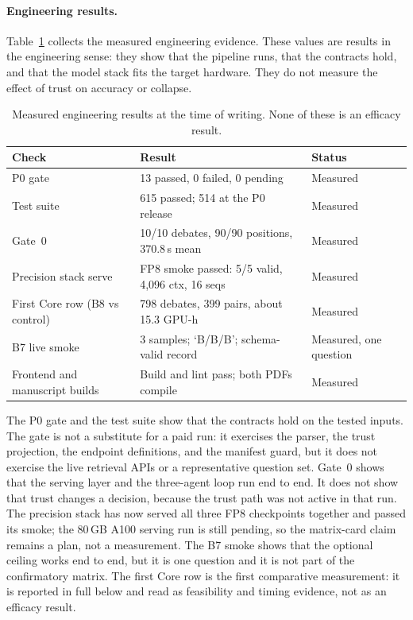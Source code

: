 \paragraph*{Engineering results.}
Table~\ref{tab:engineering-results} collects the measured engineering evidence. These values are results in the engineering sense: they show that the pipeline runs, that the contracts hold, and that the model stack fits the target hardware. They do not measure the effect of trust on accuracy or collapse.

\begin{table}[H]
  \centering
  \caption{Measured engineering results at the time of writing. None of these is an efficacy result.}
  \renewcommand{\arraystretch}{1.25}
  \small
  \begin{tabular}{|p{}|p{}|p{}|}
    \hline
    Check & Result & Status \\
    \hline
    P0 gate & 13 passed, 0 failed, 0 pending & Measured \\
    \hline
    Test suite & 615 passed; 514 at the P0 release & Measured \\
    \hline
    Gate~0 & 10/10 debates, 90/90 positions, 370.8\,s mean & Measured \\
    \hline
    Precision stack serve & FP8 smoke passed: 5/5 valid, 4{,}096 ctx, 16 seqs & Measured \\
    \hline
    First Core row (B8 vs control) & 798 debates, 399 pairs, about 15.3 GPU-h & Measured \\
    \hline
    B7 live smoke & 3 samples; `B/B/B'; schema-valid record & Measured, one question \\
    \hline
    Frontend and manuscript builds & Build and lint pass; both PDFs compile & Measured \\
    \hline
  \end{tabular}
  \label{tab:engineering-results}
\end{table}

The P0 gate and the test suite show that the contracts hold on the tested inputs. The gate is not a substitute for a paid run: it exercises the parser, the trust projection, the endpoint definitions, and the manifest guard, but it does not exercise the live retrieval APIs or a representative question set. Gate~0 shows that the serving layer and the three-agent loop run end to end. It does not show that trust changes a decision, because the trust path was not active in that run. The precision stack has now served all three FP8 checkpoints together and passed its smoke; the 80\,GB A100 serving run is still pending, so the matrix-card claim remains a plan, not a measurement. The B7 smoke shows that the optional ceiling works end to end, but it is one question and it is not part of the confirmatory matrix. The first Core row is the first comparative measurement: it is reported in full below and read as feasibility and timing evidence, not as an efficacy result.

